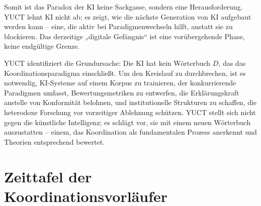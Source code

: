 \documentclass[12pt,a4paper]{article}
\begin{document}
	Somit ist das Paradox der KI keine Sackgasse, sondern eine Herausforderung. YUCT lehnt KI nicht ab; es zeigt, wie die nächste Generation von KI aufgebaut werden kann – eine, die aktiv bei Paradigmenwechseln hilft, anstatt sie zu blockieren. Das derzeitige „digitale Gefängnis“ ist eine vorübergehende Phase, keine endgültige Grenze.
	
	YUCT identifiziert die Grundursache: Die KI hat kein Wörterbuch \(D\), das das Koordinationsparadigma einschließt. Um den Kreislauf zu durchbrechen, ist es notwendig, KI-Systeme auf einem Korpus zu trainieren, der konkurrierende Paradigmen umfasst, Bewertungsmetriken zu entwerfen, die Erklärungskraft anstelle von Konformität belohnen, und institutionelle Strukturen zu schaffen, die heterodoxe Forschung vor vorzeitiger Ablehnung schützen. YUCT stellt sich nicht gegen die künstliche Intelligenz; es schlägt vor, sie mit einem neuen Wörterbuch auszustatten – einem, das Koordination als fundamentalen Prozess anerkennt und Theorien entsprechend bewertet.
	
	\section{Zeittafel der Koordinationsvorläufer}
	
\end{document}
